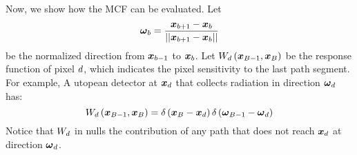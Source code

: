 \documentclass{article}
\begin{document}
Now, we show how the \ac{MCF} can be evaluated. Let
\begin{equation}
\boldsymbol{\omega}_{b} = \frac{\boldsymbol{x}_{b+1}-\boldsymbol{x}_{b}}{\left|\left| {\boldsymbol{x}_{b+1}-\boldsymbol{x}_{b}} \right|\right|}
\end{equation}
be the normalized direction from $\boldsymbol{x}_{b-1}$ to $\boldsymbol{x}_{b}$.  Let $W_{d}\left({\boldsymbol{x}_{B-1},\boldsymbol{x}_{B}}\right)$ be the response function of pixel $d$, which indicates the pixel sensitivity to the last path segment. For example, A utopean detector at $\boldsymbol{x}_{d}$ that collects radiation in direction $\boldsymbol{\omega}_{d}$ \citep{gkioulekas2016evaluation} has:
\begin{equation}
\label{eq:wd_example}
W_{d}\left({\boldsymbol{x}_{B-1},\boldsymbol{x}_{B}}\right)=\delta\left({\boldsymbol{x}_{B}-\boldsymbol{x}_{d}}\right)\delta\left({\boldsymbol{\omega}_{B-1}-\boldsymbol{\omega}_{d}}\right)
\end{equation}
Notice that $W_{d}$ in \eq{\ref{eq:wd_example}} nulls the contribution of any path that does not reach $\boldsymbol{x}_{d}$ at direction $\boldsymbol{\omega}_{d}$.
\end{document}
